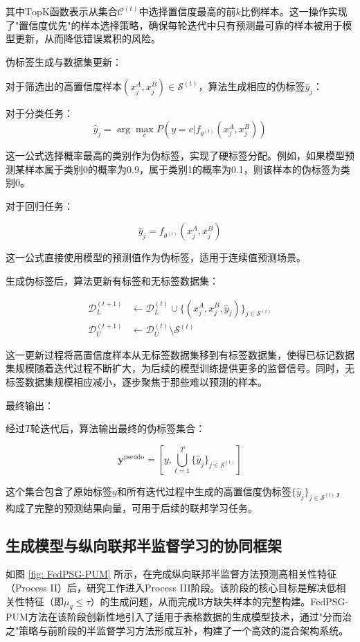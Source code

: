 其中$\text{TopK}$函数表示从集合$\mathcal{C}^{(t)}$中选择置信度最高的前$k$比例样本。这一操作实现了"置信度优先"的样本选择策略，确保每轮迭代中只有预测最可靠的样本被用于模型更新，从而降低错误累积的风险。

伪标签生成与数据集更新：

对于筛选出的高置信度样本$(x^A_j,x^B_j) \in \mathcal{S}^{(t)}$，算法生成相应的伪标签$\hat{y}_j$：

对于分类任务：
\begin{equation}
	\hat{y}_j = \arg\max_c P(y=c|f_{\theta^{(t)}}(x^A_j,x^B_j))
\end{equation}

这一公式选择概率最高的类别作为伪标签，实现了硬标签分配。例如，如果模型预测某样本属于类别0的概率为0.9，属于类别1的概率为0.1，则该样本的伪标签为类别0。

对于回归任务：

\begin{equation}
	\hat{y}_j = f_{\theta^{(t)}}(x^A_j,x^B_j)
\end{equation}

这一公式直接使用模型的预测值作为伪标签，适用于连续值预测场景。

生成伪标签后，算法更新有标签和无标签数据集：

\begin{align}
	\mathcal{D}_L^{(t+1)} &\leftarrow \mathcal{D}_L^{(t)} \cup \{(x^A_j,x^B_j,\hat{y}_j)\}_{j\in\mathcal{S}^{(t)}} \\
	\mathcal{D}_U^{(t+1)} &\leftarrow \mathcal{D}_U^{(t)} \setminus \mathcal{S}^{(t)}
\end{align}


这一更新过程将高置信度样本从无标签数据集移到有标签数据集，使得已标记数据集规模随着迭代过程不断扩大，为后续的模型训练提供更多的监督信号。同时，无标签数据集规模相应减小，逐步聚焦于那些难以预测的样本。

最终输出：

经过$T$轮迭代后，算法输出最终的伪标签集合：

\begin{equation}
	\mathbf{y}^{\text{pseudo}} = \left[ y, \bigcup_{t=1}^{T} \{\hat{y}_j\}_{j \in \mathcal{S}^{(t)}} \right]
\end{equation}


这个集合包含了原始标签$y$和所有迭代过程中生成的高置信度伪标签$\{\hat{y}_j\}_{j \in \mathcal{S}^{(t)}}$，构成了完整的预测结果向量，可用于后续的联邦学习任务。


\subsection{生成模型与纵向联邦半监督学习的协同框架}
如图 \ref{fig: FedPSG-PUM} 所示，在完成纵向联邦半监督方法预测高相关性特征（Process II）后，研究工作进入Process III阶段。该阶段的核心目标是解决低相关性特征（即$\mu_q \leq \tau$）的生成问题，从而完成B方缺失样本的完整构建。FedPSG-PUM方法在该阶段创新性地引入了适用于表格数据的生成模型技术，通过"分而治之"策略与前阶段的半监督学习方法形成互补，构建了一个高效的混合架构系统。

